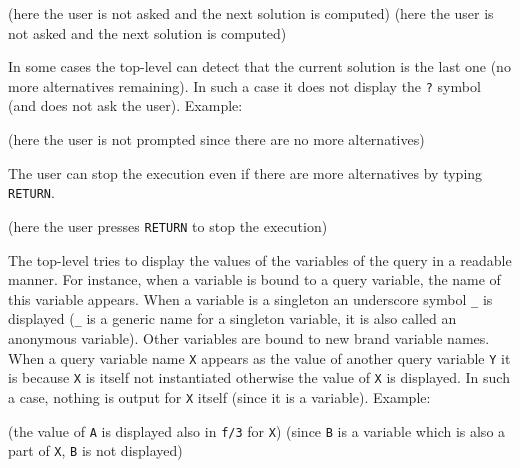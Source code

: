 \begin{CodeTwoCols}
\SkipLine
{}
\SkipLine
{}
\SkipLine
{}
    {(here the user is not asked and the next solution is
computed)}
\SkipLine
{}
     {(here the user is not asked and the next solution is
computed)}
\SkipLine
{}
\end{CodeTwoCols}

In some cases the top-level can detect that the current solution is the last
one (no more alternatives remaining). In such a case it does not display the
\texttt{?} symbol (and does not ask the user). Example:

\begin{CodeTwoCols}
\SkipLine
{}
\SkipLine
{}  {(here the user is not prompted since there are no more
alternatives)}
\SkipLine
{}
\end{CodeTwoCols}

The user can stop the execution even if there are more alternatives by
typing \texttt{RETURN}.

\begin{CodeTwoCols}
\SkipLine
{} {(here the user presses \texttt{RETURN} to stop the execution)}
\SkipLine
{}
\end{CodeTwoCols}

The top-level tries to display the values of the variables of the query in a
readable manner. For instance, when a variable is bound to a query variable,
the name of this variable appears. When a variable is a singleton an
underscore symbol \texttt{\_} is displayed (\texttt{\_} is a generic name
for a singleton variable, it is also called an anonymous variable). Other
variables are bound to new brand variable names. When a query variable name
\texttt{X} appears as the value of another query variable \texttt{Y} it is
because \texttt{X} is itself not instantiated otherwise the value of
\texttt{X} is displayed. In such a case, nothing is output for \texttt{X}
itself (since it is a variable). Example:

\begin{CodeTwoCols}
\SkipLine
{} {(the value of \texttt{A} is displayed also in \texttt{f/3} for
\texttt{X})}
 {(since \texttt{B} is a variable which is also a part
of \texttt{X}, \texttt{B} is not displayed)}
\end{CodeTwoCols}

